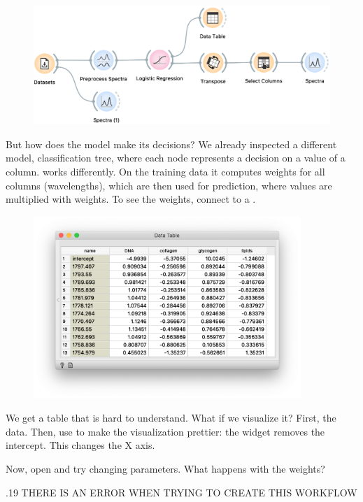 \begin{figure}
  \centering
  \includegraphics[width=1.1\textwidth]{graphics/ch-spectra_classification/sp_classification-fig3.png}%
  \label{fig:spectra_classification-fig3}
\end{figure}
But how does the model make its decisions? We already inspected a different model, classification tree, where each node represents a decision on a value of a column.   works differently. On the training data it computes weights for all columns (wavelengths), which are then used for prediction, where values are multiplied with weights. To see the weights, connect  to a . 

\begin{figure}
  \vspace{-0.5cm}
  \includegraphics[width=0.9\textwidth]{graphics/ch-spectra_classification/sp_classification-fig4.png}
  \label{fig:spectra_classification-fig4}
\end{figure}
We get a table that is hard to understand. What if we visualize it? First,  the data. Then, use  to make the visualization prettier: the widget removes the intercept. This changes the X axis.

Now, open  and try changing parameters. What happens with the weights?

\vspace{2cm}

\huge
{}.19 
THERE IS AN ERROR WHEN TRYING TO CREATE THIS WORKFLOW